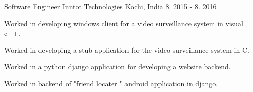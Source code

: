 \begin{cventries}

\cventry
{Software Engineer} %
{Inntot Technologies} %
{Kochi, India} %
{8. 2015 - 8. 2016} %
{ %
\begin{cvitems}
\item {Worked in developing windows client for a video surveillance system in visual c++.}
\item {Worked in developing a stub application for the video surveillance system in C.}
\item{Worked in a python django application for developing a website backend.}
\item{Worked in backend of "friend locater " android application in django.}
\end{cvitems} 
}


\end{cventries}